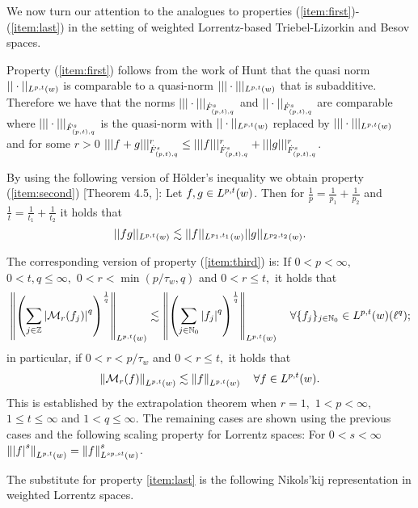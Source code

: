 We now turn our attention to the analogues to properties (\ref{item:first})-(\ref{item:last}) in the setting of weighted Lorrentz-based Triebel-Lizorkin and Besov spaces. 

Property (\ref{item:first}) follows from the work of Hunt \cite{MR0223874} that the quasi norm $||\cdot||_{\lebw{p,t}{w}}$ is comparable to a quasi-norm $|||\cdot|||_{\lebw{p,t}{w}}$ that is subadditive. Therefore we have that the norms $|||\cdot|||_{\tl{(p,t)}{s}{q}}$ and $||\cdot||_{\tl{(p,t)}{s}{q}}$ are comparable where $|||\cdot|||_{\tl{(p,t)}{s}{q}}$ is the quasi-norm with $||\cdot||_{\lebw{p,t}{w}}$ replaced by $|||\cdot|||_{\lebw{p,t}{w}}$ and for some $r>0$ $|||f+g|||^r_{\tl{(p,t)}{s}{q}} \leq |||f|||^r_{\tl{(p,t)}{s}{q}} + |||g|||^r_{\tl{(p,t)}{s}{q}}$. 

By using the following version of H\"older's inequality we obtain property (\ref{item:second}) [Theorem 4.5, \cite{MR0223874}]: Let $f,g\in \lebw{p,t}{w}$. Then for $\frac{1}{p} = \frac{1}{p_1} + \frac{1}{p_2}$ and $\frac{1}{t} = \frac{1}{t_1} + \frac{1}{t_2}$ it holds that \[||fg||_{\lebw{p,t}{w}} \lesssim ||f||_{\lebw{p_1,t_1}{w}}||g||_{\lebw{p_2,t_2}{w}} .\]

The corresponding version of property (\ref{item:third}) is: 
 If $0<p<\infty,$  $0<t,q\le\infty,$  $0<r<\min(p/\tau_w,q)$ and $0<r\le t,$ it holds that
\begin{equation}\label{eq:FTLorentz}
\norm{\left(\sum_{j\in\ent} \abs{\M_r(f_j)}^q\right)^{\frac{1}{q}}}{\lebw{p,t}{w}}\lesssim \norm{\left(\sum_{j\in\na_0} \abs{f_j}^q\right)^{\frac{1}{q}}}{\lebw{p,t}{w}}\quad \forall \{f_j\}_{j\in \na_0}\in \lebw{p,t}{w}(\ell^q);  
\end{equation}
in particular, if $0<r<p/\tau_w$ and $0<r\le t,$ it holds that 
\begin{equation*}
\norm{\M_r(f)}{\lebw{p,t}{w}}\lesssim \norm{f}{\lebw{p,t}{w}}\quad \forall f\in \lebw{p,t}{w}. 
\end{equation*}
This is established by the extrapolation theorem \cite[Theorem 4.10 and comments on page 70]{MR2797562} when $r=1,$ $1<p<\infty,$  $1\le t\le \infty$ and $1<q\le \infty.$ The remaining cases are shown using the previous cases and the following scaling property for Lorrentz spaces: For $0<s<\infty$ $\norm{\abs{f}^s}{\lebw{p,t}{w}}=\norm{f}{\lebw{sp,st}{w}}^s$.

The substitute for property \ref{item:last} is the following Nikols'kij representation in weighted Lorrentz spaces.

